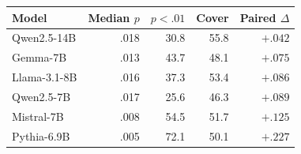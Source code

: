 \begin{tabular}{lrrrr}
\toprule
Model & Median $p$ & $p{<}.01$ & Cover & Paired $\Delta$ \\
\midrule
Qwen2.5-14B & .018 & 30.8 & 55.8 & $+.042$ \\
Gemma-7B & .013 & 43.7 & 48.1 & $+.075$ \\
Llama-3.1-8B & .016 & 37.3 & 53.4 & $+.086$ \\
Qwen2.5-7B & .017 & 25.6 & 46.3 & $+.089$ \\
Mistral-7B & .008 & 54.5 & 51.7 & $+.125$ \\
Pythia-6.9B & .005 & 72.1 & 50.1 & $+.227$ \\
\bottomrule
\end{tabular}
